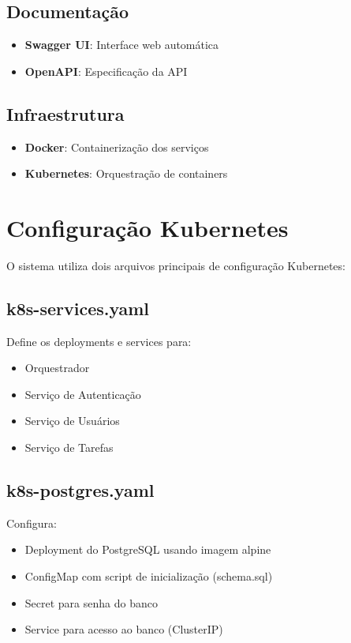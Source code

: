 \documentclass{article}
\begin{document}
\subsection{Documentação}
\begin{itemize}
    \item \textbf{Swagger UI}: Interface web automática
    \item \textbf{OpenAPI}: Especificação da API
\end{itemize}

\subsection{Infraestrutura}
\begin{itemize}
    \item \textbf{Docker}: Containerização dos serviços
    \item \textbf{Kubernetes}: Orquestração de containers
\end{itemize}

\section{Configuração Kubernetes}
O sistema utiliza dois arquivos principais de configuração Kubernetes:

\subsection{k8s-services.yaml}
Define os deployments e services para:
\begin{itemize}
    \item Orquestrador
    \item Serviço de Autenticação
    \item Serviço de Usuários
    \item Serviço de Tarefas
\end{itemize}

\subsection{k8s-postgres.yaml}
Configura:
\begin{itemize}
    \item Deployment do PostgreSQL usando imagem alpine
    \item ConfigMap com script de inicialização (schema.sql)
    \item Secret para senha do banco
    \item Service para acesso ao banco (ClusterIP)
\end{itemize}
\end{document}

